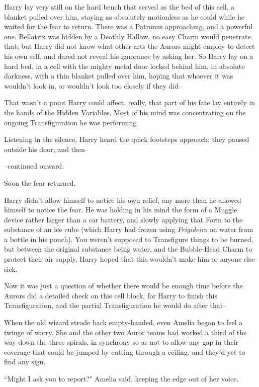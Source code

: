 \later

Harry lay very still on the hard bench that served as the bed of this cell, a blanket pulled over him, staying as absolutely motionless as he could while he waited for the fear to return. There was a Patronus approaching, and a powerful one. Bellatrix was hidden by a Deathly Hallow, no easy Charm would penetrate that; but Harry did not know what other arts the Aurors might employ to detect his own self, and dared not reveal his ignorance by asking her. So Harry lay on a hard bed, in a cell with the mighty metal door locked behind him, in absolute darkness, with a thin blanket pulled over him, hoping that whoever it was wouldn't look in, or wouldn't look too closely if they did\---

That wasn't a point Harry could affect, really, that part of his fate lay entirely in the hands of the Hidden Variables. Most of his mind was concentrating on the ongoing Transfiguration he was performing.

Listening in the silence, Harry heard the quick footsteps approach; they paused outside his door, and then\---

\---continued onward.

Soon the fear returned.

Harry didn't allow himself to notice his own relief, any more than he allowed himself to notice the fear. He was holding in his mind the form of a Muggle device rather larger than a car battery, and slowly applying that Form to the substance of an ice cube (which Harry had frozen using \emph{Frigideiro} on water from a bottle in his pouch). You weren't supposed to Transfigure things to be burned, but between the original substance being water, and the Bubble-Head Charm to protect their air supply, Harry hoped that this wouldn't make him or anyone else sick.

Now it was just a question of whether there would be enough time before the Aurors did a detailed check on this cell block, for Harry to finish this Transfiguration, and the partial Transfiguration he would do after that\---

\later

When the old wizard strode back empty-handed, even Amelia began to feel a twinge of worry. She and the other two Auror teams had worked a third of the way down the three spirals, in synchrony so as not to allow any gap in their coverage that could be jumped by cutting through a ceiling, and they'd yet to find any sign.

``Might I ask you to report?" Amelia said, keeping the edge out of her voice.


